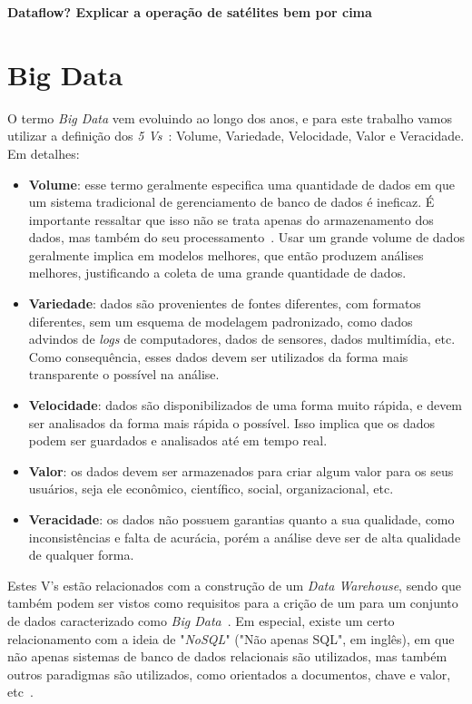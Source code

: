 {\color{red}
\textbf{Dataflow? Explicar a operação de satélites bem por cima}
}

\section{Big Data}
\label{ch:fun:bigdata}

O termo \textit{Big Data} vem evoluindo ao longo dos anos, e para este trabalho vamos utilizar a definição dos \textit{5 Vs}~\cite{bimonteOpenIssuesBig2016}: Volume, Variedade, Velocidade, Valor e Veracidade. Em detalhes:

\begin{itemize}
	\item \textbf{Volume}: esse termo geralmente especifica uma quantidade de dados em que um sistema tradicional de gerenciamento de banco de dados é ineficaz.
É importante ressaltar que isso não se trata apenas do armazenamento dos dados, mas também do seu processamento~\cite{boussoufBigDataBased2018}.
Usar um grande volume de dados geralmente implica em modelos melhores, que então produzem análises melhores, justificando a coleta de uma grande quantidade de dados.
	\item \textbf{Variedade}: dados são provenientes de fontes diferentes, com formatos diferentes, sem um esquema de modelagem padronizado, como dados advindos de \textit{logs} de computadores, dados de sensores, dados multimídia, etc.
Como consequência, esses dados devem ser utilizados da forma mais transparente o possível na análise.
	\item \textbf{Velocidade}: dados são disponibilizados de uma forma muito rápida, e devem ser analisados da forma mais rápida o possível.
Isso implica que os dados podem ser guardados e analisados até em tempo real.
	\item \textbf{Valor}: os dados devem ser armazenados para criar algum valor para os seus usuários, seja ele econômico, científico, social, organizacional, etc.
	\item \textbf{Veracidade}: os dados não possuem garantias quanto a sua qualidade, como inconsistências e falta de acurácia, porém a análise deve ser de alta qualidade de qualquer forma.
\end{itemize}

Estes V's estão relacionados com a construção de um \textit{Data Warehouse}, sendo que também podem ser vistos como requisitos para a crição de um para um conjunto de dados caracterizado como \textit{Big Data}~\cite{zhangBigDataFramework2017}.
Em especial, existe um certo relacionamento com a ideia de "\textit{NoSQL}" ("Não apenas SQL", em inglês), em que não apenas sistemas de banco de dados relacionais são utilizados, mas também outros paradigmas são utilizados, como orientados a documentos, chave e valor, etc~\cite{bimonteOpenIssuesBig2016}.

